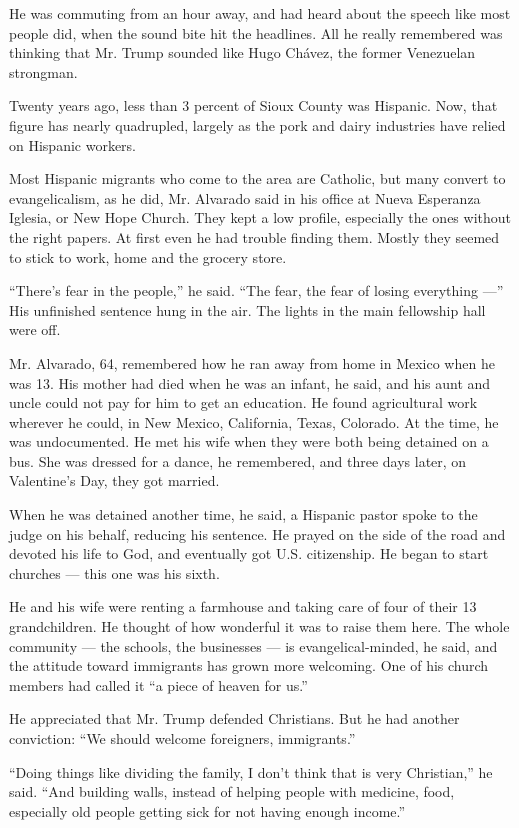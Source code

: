 He was commuting from an hour away, and had heard about the speech like
most people did, when the sound bite hit the headlines. All he really
remembered was thinking that Mr. Trump sounded like Hugo Chávez, the
former Venezuelan strongman.

Twenty years ago, less than 3 percent of Sioux County was Hispanic. Now,
that figure has nearly quadrupled, largely as the pork and dairy
industries have relied on Hispanic workers.

Most Hispanic migrants who come to the area are Catholic, but many
convert to evangelicalism, as he did, Mr. Alvarado said in his office at
Nueva Esperanza Iglesia, or New Hope Church. They kept a low profile,
especially the ones without the right papers. At first even he had
trouble finding them. Mostly they seemed to stick to work, home and the
grocery store.

``There's fear in the people,'' he said. ``The fear, the fear of losing
everything ---'' His unfinished sentence hung in the air. The lights in
the main fellowship hall were off.

Mr. Alvarado, 64, remembered how he ran away from home in Mexico when he
was 13. His mother had died when he was an infant, he said, and his aunt
and uncle could not pay for him to get an education. He found
agricultural work wherever he could, in New Mexico, California, Texas,
Colorado. At the time, he was undocumented. He met his wife when they
were both being detained on a bus. She was dressed for a dance, he
remembered, and three days later, on Valentine's Day, they got married.

When he was detained another time, he said, a Hispanic pastor spoke to
the judge on his behalf, reducing his sentence. He prayed on the side of
the road and devoted his life to God, and eventually got U.S.
citizenship. He began to start churches --- this one was his sixth.

He and his wife were renting a farmhouse and taking care of four of
their 13 grandchildren. He thought of how wonderful it was to raise them
here. The whole community --- the schools, the businesses --- is
evangelical-minded, he said, and the attitude toward immigrants has
grown more welcoming. One of his church members had called it ``a piece
of heaven for us.''

He appreciated that Mr. Trump defended Christians. But he had another
conviction: ``We should welcome foreigners, immigrants.''

``Doing things like dividing the family, I don't think that is very
Christian,'' he said. ``And building walls, instead of helping people
with medicine, food, especially old people getting sick for not having
enough income.''

